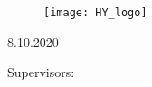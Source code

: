 \begin{titlepage}{
    \centering
    
    \begin{figure}[H]
        \centering
        \texttt{[image: HY\_logo]}
    \end{figure}
    
    \bigskip
    \bigskip
    \bigskip
    \mythesis \par
    \mysubject \par
    \mySpecSubject \par
    
    \bigskip
    \bigskip
    \MakeUppercase{\mytitle} \par
    \mysubtitle \par
    
    \bigskip
    \bigskip
    \myname
    
    8.10.2020
    
    \vfill
    
    Supervisors: \par
    \mysupervisors \par
    \bigskip
    \bigskip
    \bigskip
    \MakeUppercase{\myuni} \par
    \MakeUppercase{\myfaculty} \par
    \MakeUppercase{\mydept} \par
    \MakeUppercase{\mysubject} \par
    \addressFirst \par
    \addressSecond \par
}
\end{titlepage}